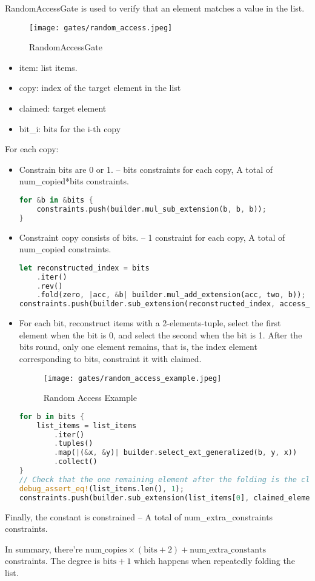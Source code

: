 
\hspace*{\fill}

\indent RandomAccessGate is used to verify that an element matches a value in the list.

\begin{figure}[!ht]
    \centering
    \texttt{[image: gates/random\_access.jpeg]}
    \caption{RandomAccessGate}
    \label{fig:random-access}
\end{figure}

\begin{itemize}
    \item item: list items.
    \item copy: index of the target element in the list
    \item claimed: target element
    \item bit\_i: bits for the i-th copy
\end{itemize}

For each copy:
\begin{itemize}
    \item Constrain bits are 0 or 1. -- bits constraints for each copy, A total of num\_copied*bits constraints.
    \begin{lstlisting}[language=rust]
for &b in &bits {
    constraints.push(builder.mul_sub_extension(b, b, b));
}
    \end{lstlisting}
    \item Constraint copy consists of bits. -- 1 constraint for each copy, A total of num\_copied constraints.
    \begin{lstlisting}[language=rust]
let reconstructed_index = bits
    .iter()
    .rev()
    .fold(zero, |acc, &b| builder.mul_add_extension(acc, two, b));
constraints.push(builder.sub_extension(reconstructed_index, access_index));
    \end{lstlisting}
    \item For each bit, reconstruct items with a 2-elements-tuple, select the first element when the bit is 0, and select the second when the bit is 1.
    After the bits round, only one element remains, that is, the index element corresponding to bits, constraint it with claimed.
    \begin{figure}[!ht]
        \centering
        \texttt{[image: gates/random\_access\_example.jpeg]}
        \caption{Random Access Example}
        \label{fig:random-access-example}
    \end{figure}
    \begin{lstlisting}[language=rust]
for b in bits {
    list_items = list_items
        .iter()
        .tuples()
        .map(|(&x, &y)| builder.select_ext_generalized(b, y, x))
        .collect()
}
// Check that the one remaining element after the folding is the claimed element.
debug_assert_eq!(list_items.len(), 1);
constraints.push(builder.sub_extension(list_items[0], claimed_element));
    \end{lstlisting}
\end{itemize}

Finally, the constant is constrained -- A total of num\_extra\_constraints constraints.

In summary, there're $\text{num\_copies} \times (\text{bits} + 2) + \text{num\_extra\_constants}$ constraints. The degree is $\text{bits} + 1$ which happens when repeatedly folding the list. 

